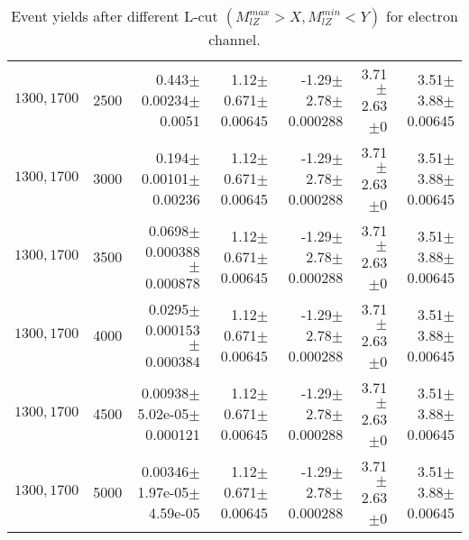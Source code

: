 \documentclass[]{article}
\begin{document}
\begin{table}
\begin{center}
{\begin{tabular}{ |r|r|r|r|r|r|r|}
$1300, 1700$ & 2500 & 0.443$\pm$0.00234$\pm$0.0051 & 1.12$\pm$0.671$\pm$0.00645 & -1.29$\pm$2.78$\pm$0.000288 & 3.71$\pm$2.63$\pm$0 & 3.51$\pm$3.88$\pm$0.00645 \\
$1300, 1700$ & 3000 & 0.194$\pm$0.00101$\pm$0.00236 & 1.12$\pm$0.671$\pm$0.00645 & -1.29$\pm$2.78$\pm$0.000288 & 3.71$\pm$2.63$\pm$0 & 3.51$\pm$3.88$\pm$0.00645 \\
$1300, 1700$ & 3500 & 0.0698$\pm$0.000388$\pm$0.000878 & 1.12$\pm$0.671$\pm$0.00645 & -1.29$\pm$2.78$\pm$0.000288 & 3.71$\pm$2.63$\pm$0 & 3.51$\pm$3.88$\pm$0.00645 \\
$1300, 1700$ & 4000 & 0.0295$\pm$0.000153$\pm$0.000384 & 1.12$\pm$0.671$\pm$0.00645 & -1.29$\pm$2.78$\pm$0.000288 & 3.71$\pm$2.63$\pm$0 & 3.51$\pm$3.88$\pm$0.00645 \\
$1300, 1700$ & 4500 & 0.00938$\pm$5.02e-05$\pm$0.000121 & 1.12$\pm$0.671$\pm$0.00645 & -1.29$\pm$2.78$\pm$0.000288 & 3.71$\pm$2.63$\pm$0 & 3.51$\pm$3.88$\pm$0.00645 \\
$1300, 1700$ & 5000 & 0.00346$\pm$1.97e-05$\pm$4.59e-05 & 1.12$\pm$0.671$\pm$0.00645 & -1.29$\pm$2.78$\pm$0.000288 & 3.71$\pm$2.63$\pm$0 & 3.51$\pm$3.88$\pm$0.00645 \\
\hline 
\end{tabular}
}
\end{center}
\caption{Event yields after different L-cut $(M_{lZ}^{max} > X, M_{lZ}^{min} < Y)$ for electron channel.}
\end{table}
\end{document}
